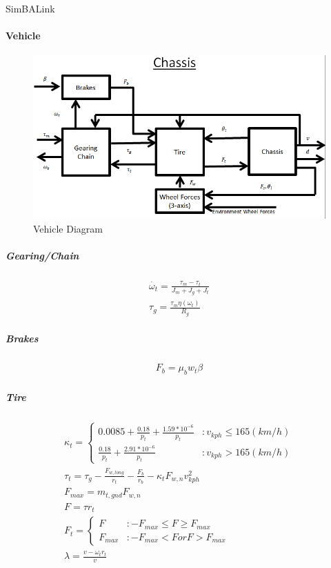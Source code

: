 \documentclass[12pt,letterpaper]{report}
\author{Nathan}
\begin{document}
\begin{center}


SimBALink

\end{center}

\paragraph{Vehicle}
\begin{figure}[H]
  \centering
  \includegraphics[scale=.75]{Vehicle_Diagram}
  \caption{Vehicle Diagram}
\end{figure}

\subparagraph{Gearing/Chain}

\begin{gather}
\dot{\omega_t} = \frac{\tau_m - \tau_t}{J_m + J_g + J_t} \\
\tau_g = \frac{\tau_m \eta (\omega_t)}{R_g}
\end{gather}

\subparagraph{Brakes}

\begin{gather}
F_b = \mu_b w_t \beta
\end{gather}

\subparagraph{Tire}

\begin{gather}
\kappa_t = 
\left\{
  \begin{array}{lr}
    0.0085 + \frac{0.18}{p_t} + \frac{1.59*10^{-6}}{p_t} & : v_{kph} \le 165 (km/h)\\
    \frac{0.18}{p_t} + \frac{2.91*10^{-6}}{p_t} & : v_{kph} > 165 (km/h)
  \end{array}
\right. \\
\tau_t = \tau_g - \frac{F_{w,long}}{r_t} - \frac{F_b}{r_b} - \kappa_t F_{w,n} v_{kph}^2 \\
F_{max} = m_{t,gnd} F_{w,n} \\
F = \tau r_t \\
F_t =
\left\{
  \begin{array}{lr}
	F & : -F_{max} \le F \ge F_{max} \\
	F_{max} & : -F_{max} < F or F > F_{max}
  \end{array}
\right. \\
\lambda = \frac{v - \omega_t r_t}{v}
\end{gather}
\end{document}
